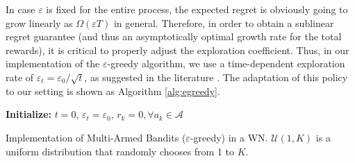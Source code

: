 \documentclass[preprint,12pt]{elsarticle}
\begin{document}
In case $\varepsilon$ is fixed for the entire process, the expected regret is obviously going to grow linearly as $\Omega\left(\varepsilon T\right)$ in general. Therefore, in order to obtain a sublinear regret guarantee (and thus an asymptotically optimal growth rate for the total rewards), it is critical to properly adjust the exploration coefficient. Thus, in our implementation of the $\varepsilon$-greedy algorithm, we use a time-dependent exploration rate of $\varepsilon_t = \varepsilon_0 / \sqrt{t}$, as suggested in the literature \cite{auer2002finite}. The adaptation of this policy to our setting is shown as Algorithm \ref{alg:egreedy}.

\begin{algorithm}[H]	
	\SetAlgoLined
	\textbf{Initialize:} $t=0$, $\varepsilon_t = \varepsilon_0$, $r_{k} = 0, \forall a_k \in \mathcal{A}$\\
	\caption{Implementation of Multi-Armed Bandits ($\varepsilon$-greedy) in a WN. $\mathcal{U}(1, K)$ is a uniform distribution that randomly chooses from 1 to $K$.}
	\label{alg:egreedy}			
\end{algorithm}
\end{document}
